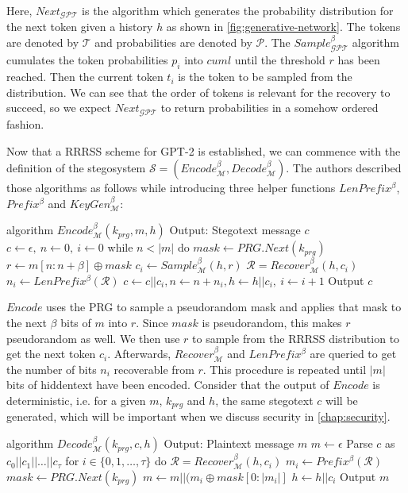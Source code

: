 Here, $Next_{\mathcal{GPT}}$ is the algorithm which generates the probability distribution for the next token given a history $h$ as shown in \autoref{fig:generative-network}.
The tokens are denoted by $\mathcal{T}$ and probabilities are denoted by $\mathcal{P}$.
The $Sample_{\mathcal{GPT}}^\beta$ algorithm cumulates the token probabilities $p_i$ into $cuml$ until the threshold $r$ has been reached.
Then the current token $t_i$ is the token to be sampled from the distribution.
We can see that the order of tokens is relevant for the recovery to succeed, so we expect $Next_{\mathcal{GPT}}$ to return probabilities in a somehow ordered fashion.

Now that a RRRSS scheme for GPT-2 is established, we can commence with the definition of the stegosystem $\mathcal{S} = \left( Encode_{\mathcal{M}}^\beta, Decode_{\mathcal{M}}^\beta \right)$.
The authors described those algorithms as follows while introducing three helper functions $LenPrefix^\beta$, $Prefix^\beta$ and $KeyGen_{\mathcal{M}}^\beta$:


\begin{Pseudocode}[caption={Meteor Encode Algorithm \cite{Meteor2021}}, label={alg:encode}]
algorithm $Encode_{\mathcal{M}}^\beta(k_{prg}, m, h)$
	Output: Stegotext message $c$
	$c \leftarrow \epsilon,~ n \leftarrow 0,~ i \leftarrow 0$
	while $n < |m|$ do
		$mask \leftarrow PRG.Next(k_{prg})$
		$r \leftarrow m[n:n+\beta] \oplus mask$
		$c_i \leftarrow Sample_{\mathcal{M}}^\beta(h, r)$
		$\mathcal{R} = Recover_{\mathcal{M}}^\beta(h, c_i)$
		$n_i \leftarrow LenPrefix^\beta(\mathcal{R})$
		$c \leftarrow c || c_i, n \leftarrow n+n_i, h \leftarrow h||c_i,~ i \leftarrow i + 1$
	Output $c$
\end{Pseudocode}

$Encode$ uses the PRG to sample a pseudorandom mask and applies that mask to the next $\beta$ bits of $m$ into $r$.
Since $mask$ is pseudorandom, this makes $r$ pseudorandom as well.
We then use $r$ to sample from the RRRSS distribution to get the next token $c_i$.
Afterwards, $Recover_{\mathcal{M}}^\beta$ and $LenPrefix^\beta$ are queried to get the number of bits $n_i$ recoverable from $r$.
This procedure is repeated until $|m|$ bits of hiddentext have been encoded.
Consider that the output of $Encode$ is deterministic, i.e. for a given $m$, $k_{prg}$ and $h$, the same stegotext $c$ will be generated, which will be important when we discuss security in \autoref{chap:security}.


\begin{Pseudocode}[float, caption={Meteor Decode Algorithm \cite{Meteor2021}}, label={alg:decode}]
algorithm $Decode_{\mathcal{M}}^\beta(k_{prg}, c, h)$
	Output: Plaintext message $m$
	$m \leftarrow \epsilon$
	Parse $c$ as $c_0 || c_1 || \dots || c_{\tau}$
	for $i \in \{ 0, 1, \dots, \tau \}$ do
		$\mathcal{R} = Recover_{\mathcal{M}}^\beta(h, c_i)$
		$m_i \leftarrow Prefix^\beta(\mathcal{R})$
		$mask \leftarrow PRG.Next(k_{prg})$
		$m \leftarrow m || (m_i \oplus mask[0: |m_i|]$
		$h \leftarrow h||c_i$
	Output $m$
\end{Pseudocode}

